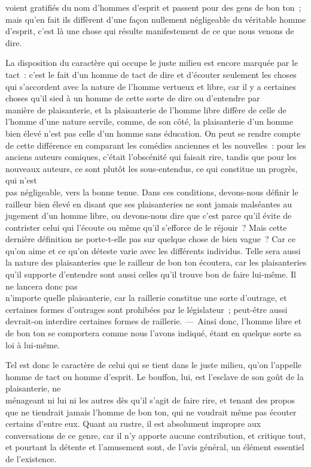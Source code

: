 \documentclass[french,twoside]{book} %
\begin{document}
voient gratifiés du nom d’hommes d’esprit et passent pour des gens de bon ton ; mais qu’en fait ils diffèrent d’une façon nullement négligeable du véritable homme d’esprit, c’est là une chose qui résulte manifestement de ce que nous venons de dire.\par
La disposition du caractère qui occupe le juste milieu est encore marquée par le tact : c’est le fait d’un homme de tact de dire et d’écouter seulement les choses qui s’accordent avec la nature de l’homme vertueux et libre, car il y a certaines choses qu’il sied à un homme de cette sorte de dire ou d’entendre par \\
manière de plaisanterie, et la plaisanterie de l’homme libre diffère de celle de l’homme d’une nature servile, comme, de son côté, la plaisanterie d’un homme bien élevé n’est pas celle d’un homme sans éducation. On peut se rendre compte de cette différence en comparant les comédies anciennes et les nouvelles : pour les anciens auteurs comiques, c’était l’obscénité qui faisait rire, tandis que pour les nouveaux auteurs, ce sont plutôt les sous-entendus, ce qui constitue un progrès, qui n’est \\
pas négligeable, vers la bonne tenue. Dans ces conditions, devons-nous définir le railleur bien élevé en disant que ses plaisanteries ne sont jamais malséantes au jugement d’un homme libre, ou devons-nous dire que c’est parce qu’il évite de contrister celui qui l’écoute ou même qu’il s’efforce de le réjouir ? Mais cette dernière définition ne porte-t-elle pas sur quelque chose de bien vague ? Car ce qu’on aime et ce qu’on déteste varie avec les différents individus. Telle sera aussi la nature des plaisanteries que le railleur de bon ton écoutera, car les plaisanteries qu’il supporte d’entendre sont aussi celles qu’il trouve bon de faire lui-même. Il ne lancera donc pas \\
n’importe quelle plaisanterie, car la raillerie constitue une sorte d’outrage, et certaines formes d’outrages sont prohibées par le législateur ; peut-être aussi devrait-on interdire certaines formes de raillerie. — Ainsi donc, l’homme libre et de bon ton se comportera comme nous l’avons indiqué, étant en quelque sorte sa loi à lui-même.\par
Tel est donc le caractère de celui qui se tient dans le juste milieu, qu’on l’appelle homme de tact ou homme d’esprit. Le bouffon, lui, est l’esclave de son goût de la plaisanterie, ne \\
ménageant ni lui ni les autres dès qu’il s’agit de faire rire, et  tenant des propos que ne tiendrait jamais l’homme de bon ton, qui ne voudrait même pas écouter certains d’entre eux. Quant au rustre, il est absolument impropre aux conversations de ce genre, car il n’y apporte aucune contribution, et critique tout, et pourtant la détente et l’amusement sont, de l’avis général, un élément essentiel de l’existence.\par
\end{document}

